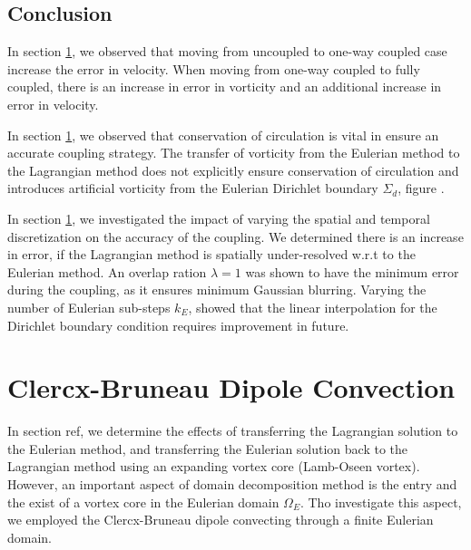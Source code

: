 %

\subsection{Conclusion}

In section \ref{}, we observed that moving from uncoupled to one-way coupled case increase the error in velocity. When moving from one-way coupled to fully coupled, there is an increase in error in vorticity and an additional increase in error in velocity.

In section \ref{}, we observed that conservation of circulation is vital in ensure an accurate coupling strategy. The transfer of vorticity from the Eulerian method to the Lagrangian method does not explicitly ensure conservation of circulation and introduces artificial vorticity from the Eulerian Dirichlet boundary $\Sigma_d$, figure .

In section \ref{}, we investigated the impact of varying the spatial and temporal discretization on the accuracy of the coupling. We determined there is an increase in error, if the Lagrangian method is spatially under-resolved w.r.t to the Eulerian method. An overlap ration $\lambda=1$ was shown to have the minimum error during the coupling, as it ensures minimum Gaussian blurring. Varying the number of Eulerian sub-steps $k_E$, showed that the linear interpolation for the Dirichlet boundary condition requires improvement in future.


\section{Clercx-Bruneau Dipole Convection}

In section ref{}, we determine the effects of transferring the Lagrangian solution to the Eulerian method, and transferring the Eulerian solution back to the Lagrangian method using an expanding vortex core (Lamb-Oseen vortex). However, an important aspect of domain decomposition method is the entry and the exist of a vortex core in the Eulerian domain $\Omega_E$. Tho investigate this aspect, we employed the Clercx-Bruneau dipole \cite{} convecting through a finite Eulerian domain. 

